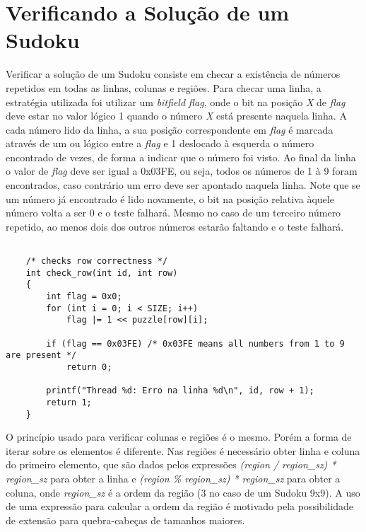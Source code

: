 \documentclass[a4paper, 12pt]{article}
\begin{document}
\section{Verificando a Solução de um Sudoku}

Verificar a solução de um Sudoku consiste em checar a existência de números
repetidos em todas as linhas, colunas e regiões. Para checar uma linha,
a estratégia utilizada foi utilizar um \textit{bitfield} \textit{flag}, onde o
bit na posição \textit{X} de \textit{flag} deve estar no valor lógico 1 quando
o número \textit{X} está presente naquela linha.
A cada número lido da linha, a sua posição correspondente em \textit{flag} é
marcada através de um ou lógico entre a \textit{flag} e 1 deslocado à esquerda
o número encontrado de vezes, de forma a indicar que o número foi visto.
Ao final da linha o valor de \textit{flag} deve ser igual a 0x03FE, ou seja,
todos os números de 1 à 9 foram encontrados, caso contrário um erro deve ser
apontado naquela linha. Note que se um número já encontrado é lido novamente, o
bit na posição relativa àquele número volta a ser 0 e o teste falhará. Mesmo no
caso de um terceiro número repetido, ao menos dois dos outros números estarão
faltando e o teste falhará.

\begin{verbatim}

    /* checks row correctness */
    int check_row(int id, int row)
    {
        int flag = 0x0;
        for (int i = 0; i < SIZE; i++)
            flag |= 1 << puzzle[row][i];

        if (flag == 0x03FE) /* 0x03FE means all numbers from 1 to 9 are present */
            return 0;

        printf("Thread %d: Erro na linha %d\n", id, row + 1);
        return 1;
    }

\end{verbatim}


O princípio usado para verificar colunas e regiões é o mesmo. Porém a forma de
iterar sobre os elementos é diferente. Nas regiões é necessário obter linha e
coluna do primeiro elemento, que são dados pelos expressões
\textit{(region / region\_sz) * region\_sz} para obter a linha e
\textit{(region \% region\_sz) * region\_sz} para obter a coluna, onde
\textit{region\_sz} é a ordem da região (3 no caso de um Sudoku 9x9). A uso
de uma expressão para calcular a ordem da região é motivado pela possibilidade
de extensão para quebra-cabeças de tamanhos maiores.
\end{document}
